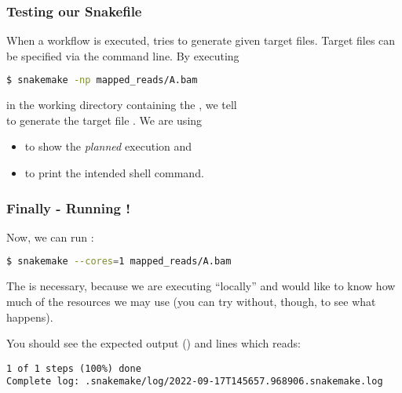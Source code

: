 \begin{frame}[fragile]
  \frametitle{Testing our Snakefile}
  When a workflow is executed, \Snakemake{} tries to generate given target files. Target files can be specified via the command line. By executing
  \begin{lstlisting}[language=Bash, style=Shell]
$ snakemake -np mapped_reads/A.bam
  \end{lstlisting}
  in the working directory containing the , we tell \\\Snakemake{} to generate the target file .\newline
  We are using 
  \begin{itemize}[<+->]
   \item {} to show the \emph{planned} execution and
   \item {} to print the intended shell command.
  \end{itemize} 
\end{frame}

\begin{frame}[fragile]
  \frametitle{Finally - Running \Snakemake{}!}
  Now, we can run \Snakemake{}:
  \begin{lstlisting}[language=Bash, style=Shell]
$ snakemake --cores=1 mapped_reads/A.bam
  \end{lstlisting}
  \begin{hint}[Note:]
  	The  is necessary, because we are executing ``locally'' and \Snakemake{} would like to know how much of the resources we may use (you can try without, though, to see what happens).
  \end{hint}
  You should see the expected output () and lines which reads:
  \begin{lstlisting}[style=Plain, basicstyle=\footnotesize]
1 of 1 steps (100%) done
Complete log: .snakemake/log/2022-09-17T145657.968906.snakemake.log
  \end{lstlisting}
\end{frame}

